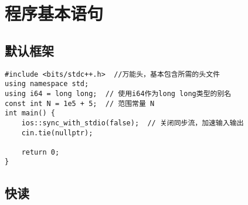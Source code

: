 \chapter{程序基本语句}
\section{默认框架}
\begin{lstlisting}[style=cpp]
#include <bits/stdc++.h>  //万能头，基本包含所需的头文件
using namespace std;
using i64 = long long;  // 使用i64作为long long类型的别名
const int N = 1e5 + 5;  // 范围常量 N
int main() {
	ios::sync_with_stdio(false);  // 关闭同步流，加速输入输出
	cin.tie(nullptr);
	
	return 0;
}
\end{lstlisting}

\section{快读}



